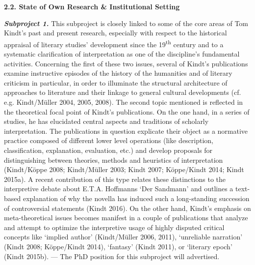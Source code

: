 
\vspace{.2cm}
\noindent\textbf{\large 2.2. State of Own Research \& Institutional Setting}
\vspace{.2cm}

\noindent \textbf{\emph{Subproject 1.}} This subproject is closely linked to some of the core areas of Tom Kindt's past and present research, especially with respect to the historical appraisal of literary studies' development since the 19\textsuperscript{th} century and to a systematic clarification of interpretation as one of the discipline's fundamental activities. Concerning the first of these two issues, several of Kindt's publications examine instructive episodes of the history of the humanities and of literary criticism in particular, in order to illuminate the structural architecture of approaches to literature and their linkage to general cultural developments (cf. e.g. Kindt/M\"uller 2004, 2005, 2008). The second topic mentioned is reflected in the theoretical focal point of Kindt's publications. On the one hand, in a series of studies, he has elucidated central aspects and traditions of scholarly interpretation. The publications in question explicate their object as a normative practice composed of different lower level operations (like description, classification, explanation, evaluation, etc.) and develop proposals for distinguishing between theories, methods and heuristics of interpretation (Kindt/K\"oppe 2008; Kindt/M\"uller 2003; Kindt 2007; K\"oppe/Kindt 2014; Kindt 2015a). A recent contribution of this type relates these distinctions to the interpretive debate about E.T.A. Hoffmanns `Der Sandmann' and outlines a text-based explanation of why the novella has induced such a long-standing succession of controversial statements (Kindt 2016). On the other hand, Kindt's emphasis on meta-theoretical issues becomes manifest in a couple of publications that analyze and attempt to optimize the interpretive usage of highly disputed critical concepts like `implied author' (Kindt/M\"uller 2006, 2011), `unreliable narration' (Kindt 2008; K\"oppe/Kindt 2014), `fantasy' (Kindt 2011), or `literary epoch' (Kindt 2015b). --- The PhD position for this subproject will advertised.


